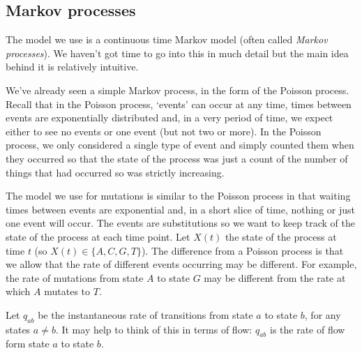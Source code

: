 \documentclass[11pt]{article}
\begin{document}


 
 \subsection{Markov processes} \label{sec:markovpro}




The model we use is a continuous time Markov model (often called {\em Markov processes}).  We haven't got time to go into this in much detail but the main idea behind it is relatively intuitive.  

We've already seen a simple Markov process, in the form of the Poisson process.  Recall that in the Poisson process, `events' can occur at any time, times between events are exponentially distributed and, in a very period of time, we expect either to see no events or one event (but not two or more). In the Poisson process, we only considered a single type of event and simply counted them when they occurred so that the state of the process was just a count of the number of things that had occurred so was strictly increasing.   

The model we use for mutations is similar to the Poisson process in that waiting times between events are exponential and, in a short slice of time, nothing or just one event will occur.  The events  are substitutions so we want to keep track of the state of the process at each time point.  Let $X(t)$ the  state of the process at time $t$ (so $X(t) \in \{A,C,G,T \}$).  The difference from a Poisson process is that we allow that the rate of different events occurring may be different.  For example, the rate of mutations  from state $A$ to state $G$ may be different from the rate at which $A$ mutates to $T$. 

Let $q_{ab}$ be the instantaneous rate of transitions from state $a$ to state $b$, for any states $a \neq b$.    It may help to think of this in terms of flow: $q_{ab}$ is the rate of flow form state $a$ to state $b$.
\end{document}
